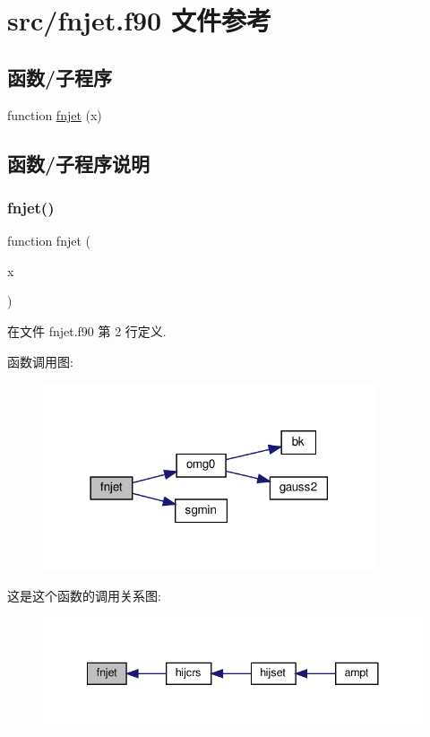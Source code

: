 \hypertarget{fnjet_8f90}{}\section{src/fnjet.f90 文件参考}
\label{fnjet_8f90}
\subsection*{函数/子程序}
\begin{DoxyCompactItemize}
\item 
function \mbox{\hyperlink{fnjet_8f90_a31415a321b4076169eee2f3d5e9a4acc}{fnjet}} (x)
\end{DoxyCompactItemize}


\subsection{函数/子程序说明}
\mbox{\label{fnjet_8f90_a31415a321b4076169eee2f3d5e9a4acc}} 
\subsubsection{\texorpdfstring{fnjet()}{fnjet()}}
{\footnotesize\ttfamily function fnjet (\begin{DoxyParamCaption}\item[{}]{x }\end{DoxyParamCaption})}



在文件 fnjet.\+f90 第 2 行定义.

函数调用图\+:
\nopagebreak
\begin{figure}[H]
\begin{center}
\leavevmode
\includegraphics[width=278pt]{fnjet_8f90_a31415a321b4076169eee2f3d5e9a4acc_cgraph}
\end{center}
\end{figure}
这是这个函数的调用关系图\+:
\nopagebreak
\begin{figure}[H]
\begin{center}
\leavevmode
\includegraphics[width=341pt]{fnjet_8f90_a31415a321b4076169eee2f3d5e9a4acc_icgraph}
\end{center}
\end{figure}
